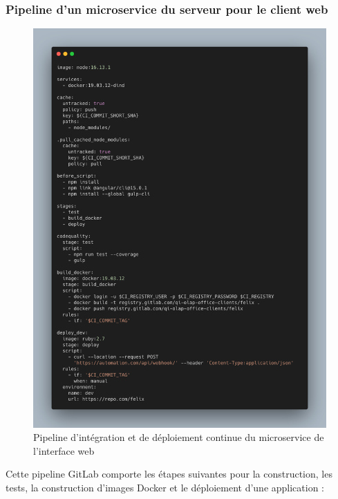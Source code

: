 \documentclass[a4paper, 11pt]{report}
\begin{document}
\subsubsection{Pipeline d'un microservice du serveur pour le client web}
  \begin{figure}[H]
      \centering
      \includegraphics[scale=0.35,center]{screenshots/CICD-Felix.png}
      \caption{Pipeline d'intégration et de déploiement continue du microservice de l'interface web}
  \end{figure}
  Cette pipeline GitLab comporte les étapes suivantes pour la
construction, les tests, la construction d'images Docker et le
déploiement d'une application :
\end{document}
